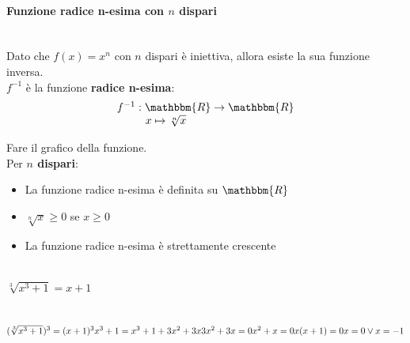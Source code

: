 \documentclass[12pt]{report}
\newcounter{exercise}
\begin{document}
	\paragraph{Funzione radice n-esima con $n$ dispari} \quad \\
	Dato che $f(x) = x^n$ con $n$ dispari è iniettiva, allora esiste la sua funzione inversa. \\
	$f^{-1}$ è la funzione \textbf{radice n-esima}:
	\[
	\begin{array}{l}
		f^{-1}: \mathbbm{R} \to \mathbbm{R} \\
		\phantom{f^{-1}:\ } x \mapsto \sqrt[n]{x}
	\end{array}
	\]
	\begin{center}
	\end{center}
	Fare il grafico della funzione. \\
	Per \textbf{$n$ dispari}:
	\begin{itemize}
		\item La funzione radice n-esima è definita su $\mathbbm{R}$
		\item $\sqrt[n]{x} \geq 0$ se $x \geq 0$
		\item La funzione radice n-esima è strettamente crescente
	\end{itemize}
	\begin{assignment}{}{} \quad \\
		$\sqrt[3]{x^3 + 1} = x + 1$
		\begin{exercise}{}{} \quad \\
			$(\sqrt[3]{x^3 + 1})^3 = (x+1)^3 \\
			x^3 + 1 = x^3 + 1 + 3x^2 + 3x \\
			3x^2 + 3x = 0 \\
			x^2 + x = 0 \\
			x(x + 1) = 0 \\
			x = 0 \vee x=-1
			$
		\end{exercise}
	\end{assignment}
\end{document}
